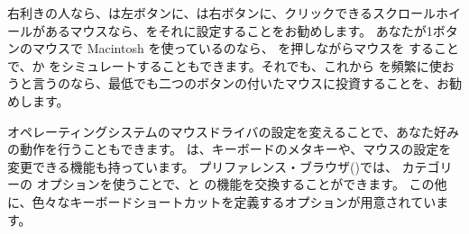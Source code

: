\documentclass[a4paper,10pt,twoside]{book}
\begin{document}





右利きの人なら、\click は左ボタンに、\actclick は右ボタンに、クリックできるスクロールホイールがあるマウスなら、\metaclick をそれに設定することをお勧めします。
あなたが1ボタンのマウスで Macintosh を使っているのなら、\clover{} を押しながらマウスを \click することで、\actclick か \metaclick をシミュレートすることもできます。それでも、これから \pharo を頻繁に使おうと言うのなら、最低でも二つのボタンの付いたマウスに投資することを、お勧めします。

オペレーティングシステムのマウスドライバの設定を変えることで、あなた好みの動作を行うこともできます。
\pharo は、キーボードのメタキーや、マウスの設定を変更できる機能も持っています。
プリファレンス・ブラウザ()では、 カテゴリーの  オプションを使うことで、\actclick と \metaclick の機能を交換することができます。
この他に、色々なキーボードショートカットを定義するオプションが用意されています。
\end{document}
